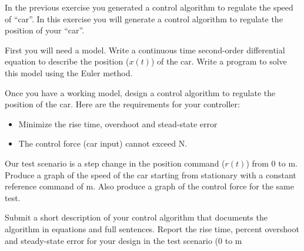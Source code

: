 \begin{ex}
In the previous exercise you generated a control algorithm to regulate the speed of ``car''.  In this exercise you will generate a control algorithm to regulate the position of your ``car''.

First you will need a model.  Write a continuous time second-order differential equation to describe the position ($x(t)$) of the car.  Write a program to solve this model using the Euler method.

Once you have a working model, design a control algorithm to regulate the position of the car.   Here are the requirements for your controller:
\begin{itemize}
\item Minimize the rise time, overshoot and stead-state error
\item The control force (car input) cannot exceed \unit[15,000]{N}.
\end{itemize}

Our test scenario is a step change in the position command ($r(t)$) from 0 to \unit[100]{m}. Produce a graph of the speed of the car starting from stationary with a constant reference command of \unit[100]{m}.  Also produce a graph of the control force for the same test.

Submit a short description of your control algorithm that documents the algorithm in equations and full sentences.  Report the rise time, percent overshoot and steady-state error for your design in the test scenario (0 to \unit[100]{m}
\end{ex}
